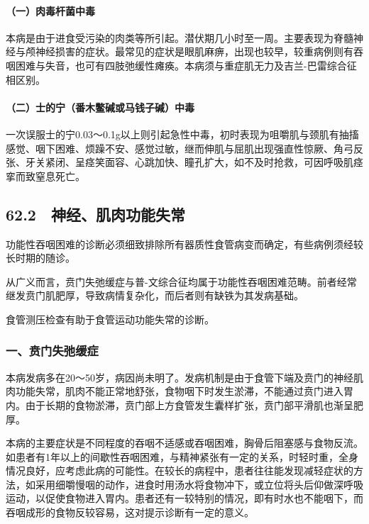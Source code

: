 \paragraph{（一）肉毒杆菌中毒}

本病是由于进食受污染的肉类等所引起。潜伏期几小时至一周。主要表现为脊髓神经与颅神经损害的症状。最常见的症状是眼肌麻痹，出现也较早，较重病例则有吞咽困难与失音，也可有四肢弛缓性瘫痪。本病须与重症肌无力及吉兰-巴雷综合征相区别。

\paragraph{（二）士的宁（番木鳖碱或马钱子碱）中毒}

一次误服士的宁0.03～0.1g以上则引起急性中毒，初时表现为咀嚼肌与颈肌有抽搐感觉、咽下困难、烦躁不安、感觉过敏，继而伸肌与屈肌出现强直性惊厥、角弓反张、牙关紧闭、呈痉笑面容、心跳加快、瞳孔扩大，如不及时抢救，可因呼吸肌痉挛而致窒息死亡。

\protect\hypertarget{text00158.html}{}{}

\subsection{62.2　神经、肌肉功能失常}

功能性吞咽困难的诊断必须细致排除所有器质性食管病变而确定，有些病例须经较长时期的随诊。

从广义而言，贲门失弛缓症与普-文综合征均属于功能性吞咽困难范畴。前者经常继发贲门肌肥厚，导致病情复杂化，而后者则有缺铁为其发病基础。

食管测压检查有助于食管运动功能失常的诊断。

\subsubsection{一、贲门失弛缓症}

本病发病多在20～50岁，病因尚未明了。发病机制是由于食管下端及贲门的神经肌肉功能失常，肌肉不能正常地舒张，食物咽下时发生淤滞，不能通过贲门进入胃内。由于长期的食物淤滞，贲门部上方食管发生囊样扩张，贲门部平滑肌也渐呈肥厚。

本病的主要症状是不同程度的吞咽不适感或吞咽困难，胸骨后阻塞感与食物反流。如患者有1年以上的间歇性吞咽困难，与精神紧张有一定的关系，时轻时重，全身情况良好，应考虑此病的可能性。在较长的病程中，患者往往能发现减轻症状的方法，如采用细嚼慢咽的动作，进食时用汤水将食物冲下，或立位将头后仰做深呼吸运动，以促使食物进入胃内。患者还有一较特别的情况，即有时水也不能咽下，而吞咽成形的食物反较容易，这对提示诊断有一定的意义。

